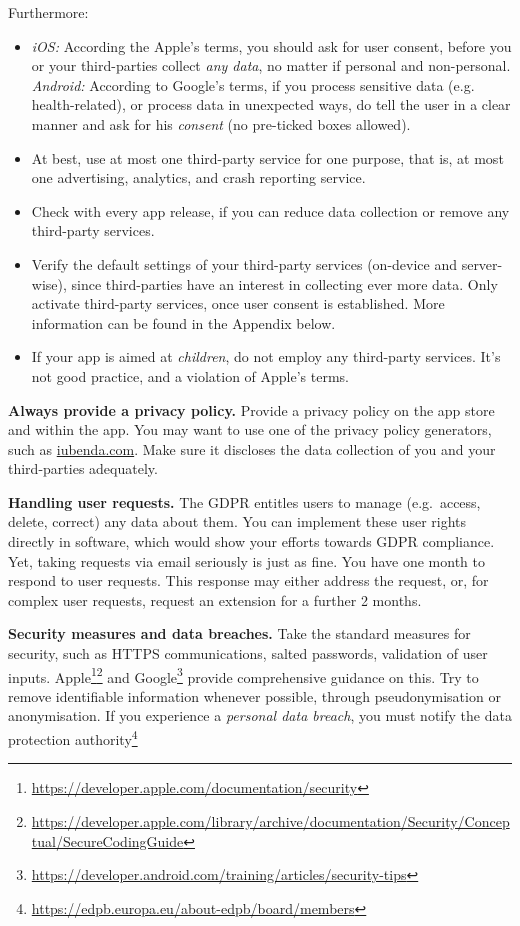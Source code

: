 \documentclass[
	12pt,
	a4paper,
	]{scrartcl}
\begin{document}
	Furthermore:
	\begin{itemize}
		\item
		\textit{iOS:} According the Apple's terms, you should ask
		for user consent, before you or your third-parties collect 
		\emph{any data}, no matter if personal and non-personal.\\	
		\textit{Android:}  According
		to Google's terms, if you process sensitive data (e.g. 
		health-related), 
		or process data in unexpected ways, do tell the user in a clear 
		manner 
		and ask for his \textit{consent} (no pre-ticked boxes allowed).
		\item At best, use at most one third-party service for one 
		purpose, 
		that is, at most one advertising, analytics, and crash reporting 
		service.
		\item Check with every app release, if you can reduce data 
		collection or remove any third-party services.
		\item Verify the default settings of your third-party services 
		(on-device and server-wise), since third-parties have an interest 
		in 
		collecting ever more data.
		Only activate third-party services, once user consent is 
		established. More information can be
		found in the Appendix below.
		\item If your app is aimed at \textit{children}, do not employ any 
		third-party services. It's not good practice, and a
		violation of Apple's terms.
	\end{itemize}
	
	\textbf{Always provide a privacy policy.}
	Provide a privacy policy on the app store and within the app.
	You may want to use one of the privacy policy generators, such as 
	\url{iubenda.com}.
	Make sure it discloses the data collection of you and your 
	third-parties 
	adequately.
	
	\textbf{Handling user requests.}
	The GDPR entitles users to manage
	(e.g.~access, delete, correct) any data about them. You can implement
	these user rights directly in software, which would show your efforts
	towards GDPR compliance. Yet, taking requests via email seriously is
	just as fine. You have one month to respond to user requests. This
	response may either address the request, or, for complex user requests,
	request an extension for a further 2 months.
	
	\textbf{Security measures and data breaches.}
	Take the standard measures for security, such as HTTPS communications, 
	salted passwords, validation of user inputs.
	Apple\footnote{\url{https://developer.apple.com/documentation/security}}\footnote{\url{https://developer.apple.com/library/archive/documentation/Security/Conceptual/SecureCodingGuide}}
	 and 
	Google\footnote{\url{https://developer.android.com/training/articles/security-tips}}
	 provide comprehensive guidance on this.
	Try to remove identifiable information whenever possible, through 
	pseudonymisation or anonymisation.
	If you experience a \textit{personal data breach}, you must notify the 
	data protection 
	authority\footnote{\url{https://edpb.europa.eu/about-edpb/board/members}}
	 
\end{document}
